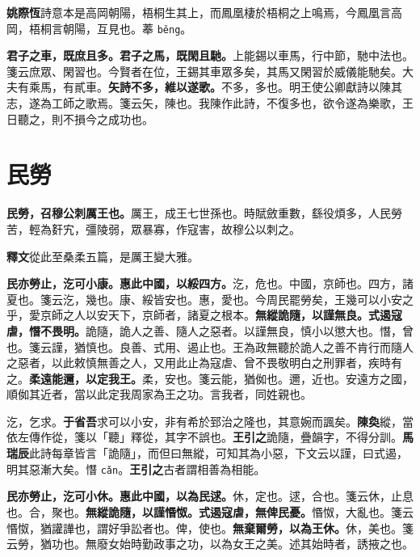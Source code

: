 \begin{quoting}\textbf{姚際恆}詩意本是高岡朝陽，梧桐生其上，而鳳凰棲於梧桐之上鳴焉，今鳳凰言高岡，梧桐言朝陽，互見也。菶 \texttt{běng}。\end{quoting}

\textbf{君子之車，既庶且多。君子之馬，既閑且馳。}{\footnotesize 上能錫以車馬，行中節，馳中法也。箋云庶眾、閑習也。今賢者在位，王錫其車眾多矣，其馬又閑習於威儀能馳矣。大夫有乘馬，有貳車。}\textbf{矢詩不多，維以遂歌。}{\footnotesize 不多，多也。明王使公卿獻詩以陳其志，遂為工師之歌焉。箋云矢，陳也。我陳作此詩，不復多也，欲令遂為樂歌，王日聽之，則不損今之成功也。}

\section{民勞}


\textbf{民勞，召穆公刺厲王也。}{\footnotesize 厲王，成王七世孫也。時賦斂重數，繇役煩多，人民勞苦，輕為姧宄，彊陵弱，眾暴寡，作寇害，故穆公以刺之。}

\begin{quoting}\textbf{釋文}從此至桑柔五篇，是厲王變大雅。\end{quoting}

\textbf{民亦勞止，汔可小康。惠此中國，以綏四方。}{\footnotesize 汔，危也。中國，京師也。四方，諸夏也。箋云汔，幾也。康、綏皆安也。惠，愛也。今周民罷勞矣，王幾可以小安之乎，愛京師之人以安天下，京師者，諸夏之根本。}\textbf{無縱詭隨，以謹無良。式遏寇虐，憯不畏明。}{\footnotesize 詭隨，詭人之善、隨人之惡者。以謹無良，慎小以懲大也。憯，曾也。箋云謹，猶慎也。良善、式用、遏止也。王為政無聽於詭人之善不肯行而隨人之惡者，以此敕慎無善之人，又用此止為寇虐、曾不畏敬明白之刑罪者，疾時有之。}\textbf{柔遠能邇，以定我王。}{\footnotesize 柔，安也。箋云能，猶侞也。邇，近也。安遠方之國，順侞其近者，當以此定我周家為王之功。言我者，同姓親也。}

\begin{quoting}汔，乞求。\textbf{于省吾}求可以小安，非有希於郅治之隆也，其意婉而諷矣。\textbf{陳奐}縱，當依左傳作從，箋以「聽」釋從，其字不誤也。\textbf{王引之}詭隨，疊韻字，不得分訓。\textbf{馬瑞辰}此詩每章皆言「詭隨」，而但曰無縱，可知其為小惡，下文云以謹，曰式遏，明其惡漸大矣。憯 \texttt{cǎn}。\textbf{王引之}古者謂相善為相能。\end{quoting}

\textbf{民亦勞止，汔可小休。惠此中國，以為民逑。}{\footnotesize 休，定也。逑，合也。箋云休，止息也。合，聚也。}\textbf{無縱詭隨，以謹惽怓。式遏寇虐，無俾民憂。}{\footnotesize 惽怓，大亂也。箋云惽怓，猶讙譁也，謂好爭訟者也。俾，使也。}\textbf{無棄爾勞，以為王休。}{\footnotesize 休，美也。箋云勞，猶功也。無廢女始時勤政事之功，以為女王之美。述其始時者，誘掖之也。}

